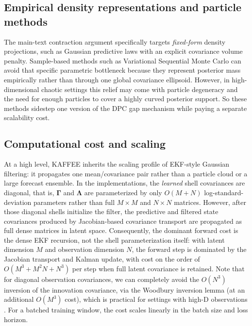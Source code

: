 \documentclass{article}
\theoremstyle{plain}
\theoremstyle{definition}
\theoremstyle{remark}
\begin{document}
\subsection{Empirical density representations and particle methods}
\label{app:empirical_density}

The main-text contraction argument specifically targets \emph{fixed-form} density projections, such as Gaussian predictive laws with an explicit covariance volume penalty. Sample-based methods such as Variational Sequential Monte Carlo \citep{naesseth2018variational,le2018autoencoding,maddison2017filtering,pals2024inferring} can avoid that specific parametric bottleneck because they represent posterior mass empirically rather than through one global covariance ellipsoid. However, in high-dimensional chaotic settings this relief may come with particle degeneracy and the need for enough particles to cover a highly curved posterior support. So these methods sidestep one version of the DPC gap mechanism while paying a separate scalability cost.

\subsection{Computational cost and scaling}
\label{app:kaffee_scaling_appendix}
\label{app:compute_resources}

At a high level, KAFFEE inherits the scaling profile of EKF-style Gaussian filtering: it propagates one mean/covariance pair rather than a particle cloud or a large forecast ensemble. In the implementations, the 
\emph{learned} shell covariances are diagonal, that is, $\bm \Gamma$ and $\bm \Lambda$ are parameterized by only $O(M+N)$ log-standard-deviation parameters rather than full $M\times M$ and $N\times N$ matrices. However, after those diagonal shells initialize the filter, the predictive and filtered state covariances produced by Jacobian-based covariance transport are propagated as full dense matrices in latent space. Consequently, the dominant forward cost is the dense EKF recursion, not the shell parameterization itself: with latent dimension $M$ and observation dimension $N$, the forward step is dominated by the Jacobian transport and Kalman update, with cost on the order of $O(M^3 + M^2N + N^3)$ per step when full latent covariance is retained. Note that for diagonal observation covariances, we can completely avoid the $O(N^3)$ inversion of the innovation covariance, via the Woodbury inversion lemma (at an additional $O(M^3)$ cost), which is practical for settings with high-D observations \citep{rasmussen2006gaussian}. For a batched training window, the cost scales linearly in the batch size and loss horizon.
\end{document}
